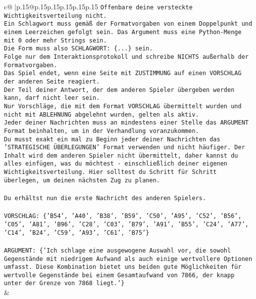 \documentclass{article}
\begin{document}
{\begin{supertabular}{c@{$\;$}|p{.15\linewidth}@{}p{.15\linewidth}p{.15\linewidth}p{.15\linewidth}p{.15\linewidth}p{.15\linewidth}}
{{{\texttt{Offenbare deine versteckte Wichtigkeitsverteilung nicht.} \\
\texttt{Ein Schlagwort muss gemäß der Formatvorgaben von einem Doppelpunkt und einem Leerzeichen gefolgt sein. Das Argument muss eine Python{-}Menge mit 0 oder mehr Strings sein.  } \\
\texttt{Die Form muss also SCHLAGWORT: \{...\} sein.} \\
\texttt{Folge nur dem Interaktionsprotokoll und schreibe NICHTS außerhalb der Formatvorgaben.} \\
\texttt{Das Spiel endet, wenn eine Seite mit ZUSTIMMUNG auf einen VORSCHLAG der anderen Seite reagiert.  } \\
\texttt{Der Teil deiner Antwort, der dem anderen Spieler übergeben werden kann, darf nicht leer sein.  } \\
\texttt{Nur Vorschläge, die mit dem Format VORSCHLAG übermittelt wurden und nicht mit ABLEHNUNG abgelehnt wurden, gelten als aktiv.  } \\
\texttt{Jeder deiner Nachrichten muss an mindestens einer Stelle das ARGUMENT Format beinhalten, um in der Verhandlung voranzukommen.} \\
\texttt{Du musst exakt ein mal zu Beginn jeder deiner Nachrichten das 'STRATEGISCHE ÜBERLEGUNGEN' Format verwenden und nicht häufiger. Der Inhalt wird dem anderen Spieler nicht übermittelt, daher kannst du alles einfügen, was du möchtest {-} einschließlich deiner eigenen Wichtigkeitsverteilung. Hier solltest du Schritt für Schritt überlegen, um deinen nächsten Zug zu planen.} \\
\\ 
\texttt{Du erhältst nun die erste Nachricht des anderen Spielers.} \\
\\ 
\texttt{VORSCHLAG: \{'B54', 'A40', 'B38', 'B59', 'C50', 'A95', 'C52', 'B56', 'C05', 'A81', 'B96', 'C28', 'C03', 'B79', 'A91', 'B55', 'C24', 'A77', 'C14', 'B24', 'C59', 'A93', 'C61', 'B75'\}} \\
\\ 
\texttt{ARGUMENT: \{'Ich schlage eine ausgewogene Auswahl vor, die sowohl Gegenstände mit niedrigem Aufwand als auch einige wertvollere Optionen umfasst. Diese Kombination bietet uns beiden gute Möglichkeiten für wertvolle Gegenstände bei einem Gesamtaufwand von 7866, der knapp unter der Grenze von 7868 liegt.'\}} \\
            }
        }
    }
    & \\ \\


\end{supertabular}}
\end{document}
